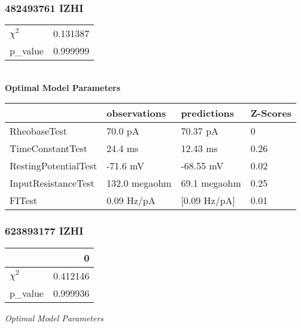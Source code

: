 \subsubsection{482493761 IZHI}\begin{tabular}{lr}
\toprule
$\chi^{2}$ &  0.131387 \\
p\_value    &  0.999999 \\
\bottomrule
\end{tabular}
\\
\textbf{Optimal Model Parameters} 
\newline
\begin{table}[ht]
\centering
{}
\end{table} 


\begin{tabular}{llll}
\toprule
{} &   observations &   predictions & Z-Scores \\
\midrule
RheobaseTest         &        70.0 pA &      70.37 pA &        0 \\
TimeConstantTest     &        24.4 ms &      12.43 ms &     0.26 \\
RestingPotentialTest &       -71.6 mV &     -68.55 mV &     0.02 \\
InputResistanceTest  &  132.0 megaohm &  69.1 megaohm &     0.25 \\
FITest               &     0.09 Hz/pA &  [0.09 Hz/pA] &     0.01 \\
\bottomrule
\end{tabular}
\subsubsection{623893177 IZHI}
\begin{tabular}{lr}
\toprule
{} &         0 \\
\midrule
$\chi^{2}$ &  0.412146 \\
p\_value    &  0.999936 \\
\bottomrule
\end{tabular}
\emph{Optimal Model Parameters}


